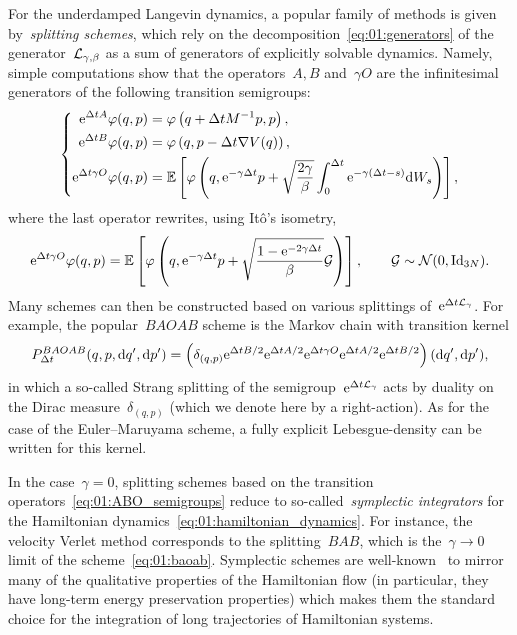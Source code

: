 For the underdamped Langevin dynamics, a popular family of methods is given by~\textit{splitting schemes}, which rely on the decomposition~\eqref{eq:01:generators}  of the generator~$\mathcal{L}_{\gamma,\beta}$ as a sum of generators of explicitly solvable dynamics.
Namely, simple computations show that the operators~$A,B$ and~$\gamma O$ are the infinitesimal generators of the following transition semigroups:
\begin{equation}
    \label{eq:01:ABO_semigroups}
    \left\{\begin{aligned}
    \mathrm{e}^{\Delta t A} \varphi(q,p) &= \varphi\left(q+\Delta t M^{-1} p,p\right),\\
    \mathrm{e}^{\Delta t B} \varphi(q,p) &= \varphi\left(q,p-\Delta t\nabla V(q)\right),\\
    \mathrm{e}^{\Delta t\gamma O} \varphi(q,p) &= \mathbb{E}\left[\varphi\left(q,\mathrm{e}^{-\gamma \Delta t}p + \sqrt{\frac{2\gamma}{\beta}}\int_0^{\Delta t} \mathrm{e}^{-\gamma (\Delta t -s)}\mathrm{d} W_s\right)\right],
    \end{aligned}\right.
\end{equation}
where the last operator rewrites, using It\^o's isometry,
\begin{equation}
    \mathrm{e}^{\Delta t\gamma O}\varphi(q,p) = \mathbb{E}\left[\varphi\left(q,\mathrm{e}^{-\gamma\Delta t}p + \sqrt{\frac{1-\mathrm{e}^{-2\gamma\Delta t}}{\beta}}\mathcal G\right)\right],\qquad \mathcal G \sim \mathcal N(0,\mathrm{Id}_{3N}).
\end{equation}
Many schemes can then be constructed based on various splittings of~$\mathrm{e}^{\Delta t\mathcal{L}_\gamma}$. For example, the popular~$BAOAB$ scheme is the Markov chain with transition kernel
\begin{equation}
    \label{eq:01:baoab}
     P_{\Delta t}^{BAOAB}(q,p,\mathrm{d} q',\mathrm{d} p') = \left(\delta_{(q,p)}\mathrm{e}^{\Delta t B/2}\mathrm{e}^{\Delta t A/2}\mathrm{e}^{\Delta t \gamma O}\mathrm{e}^{\Delta t A/2}\mathrm{e}^{\Delta t B/2}\right)(\mathrm{d} q',\mathrm{d} p'),
\end{equation}
in which a so-called Strang splitting of the semigroup~$\mathrm{e}^{\Delta t\mathcal{L}_\gamma}$ acts by duality on the Dirac measure~$\delta_{(q,p)}$ (which we denote here by a right-action).
As for the case of the Euler--Maruyama scheme, a fully explicit Lebesgue-density can be written for this kernel.

In the case~$\gamma=0$, splitting schemes based on the transition operators~\eqref{eq:01:ABO_semigroups} reduce to so-called~\textit{symplectic integrators} for the Hamiltonian dynamics~\eqref{eq:01:hamiltonian_dynamics}.
For instance, the velocity Verlet method corresponds to the splitting~$BAB$, which is the~$\gamma\to 0$ limit of the scheme~\eqref{eq:01:baoab}. Symplectic schemes are well-known~\cite{HLW03,HWL06} to mirror many of the qualitative properties of the Hamiltonian flow (in particular, they have long-term energy preservation properties) which makes them the standard choice for the integration of long trajectories of Hamiltonian systems.

